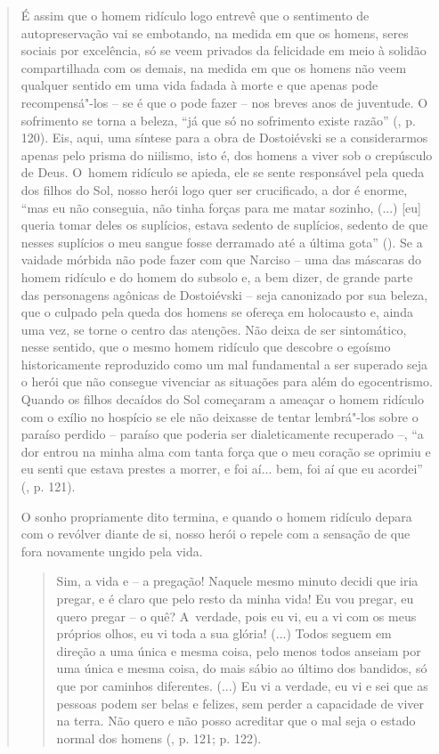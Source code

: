{\begin{quote}
É assim que o homem ridículo logo entrevê que o sentimento de
autopreservação vai se embotando, na medida em que os homens, seres
sociais por excelência, só se veem privados da felicidade em meio à
solidão compartilhada com os demais, na medida em que os homens não veem
qualquer sentido em uma vida fadada à morte e que apenas pode
recompensá"-los -- se é que o pode fazer -- nos breves anos de juventude.
O sofrimento se torna a beleza, ``já que só no sofrimento existe razão''
(, p. 120). Eis, aqui, uma síntese para a obra de Dostoiévski se a
considerarmos apenas pelo prisma do niilismo, isto é, dos homens a viver
sob o crepúsculo de Deus. O~homem ridículo se apieda, ele se sente
responsável pela queda dos filhos do Sol, nosso herói logo quer ser
crucificado, a dor é enorme, ``mas eu não conseguia, não tinha forças
para me matar sozinho, (...) {[}eu{]} queria tomar deles os suplícios,
estava sedento de suplícios, sedento de que nesses suplícios o meu
sangue fosse derramado até a última gota'' (). Se a vaidade
mórbida não pode fazer com que Narciso -- uma das máscaras do homem
ridículo e do homem do subsolo e, a bem dizer, de grande parte das
personagens agônicas de Dostoiévski -- seja canonizado por sua beleza,
que o culpado pela queda dos homens se ofereça em holocausto e, ainda
uma vez, se torne o centro das atenções. Não deixa de ser sintomático,
nesse sentido, que o mesmo homem ridículo que descobre o egoísmo
historicamente reproduzido como um mal fundamental a ser superado seja o
herói que não consegue vivenciar as situações para além do egocentrismo.
Quando os filhos decaídos do Sol começaram a ameaçar o homem ridículo
com o exílio no hospício se ele não deixasse de tentar lembrá"-los sobre
o paraíso perdido -- paraíso que poderia ser dialeticamente recuperado
--, ``a dor entrou na minha alma com tanta força que o meu coração se
oprimiu e eu senti que estava prestes a morrer, e foi aí... bem, foi aí
que eu acordei'' (, p. 121).

O sonho propriamente dito termina, e quando o homem ridículo depara com
o revólver diante de si, nosso herói o repele com a sensação de que fora
novamente ungido pela vida.

\begin{quote}
Sim, a vida e -- a pregação! Naquele mesmo minuto decidi que iria
pregar, e é claro que pelo resto da minha vida! Eu vou pregar, eu quero
pregar -- o quê? A~verdade, pois eu vi, eu a vi com os meus próprios
olhos, eu vi toda a sua glória! (...) Todos seguem em direção a uma
única e mesma coisa, pelo menos todos anseiam por uma única e mesma
coisa, do mais sábio ao último dos bandidos, só que por caminhos
diferentes. (...) Eu vi a verdade, eu vi e sei que as pessoas podem ser
belas e felizes, sem perder a capacidade de viver na terra. Não quero e
não posso acreditar que o mal seja o estado normal dos homens (, p.
121; p. 122).
\end{quote}


\end{quote}}
